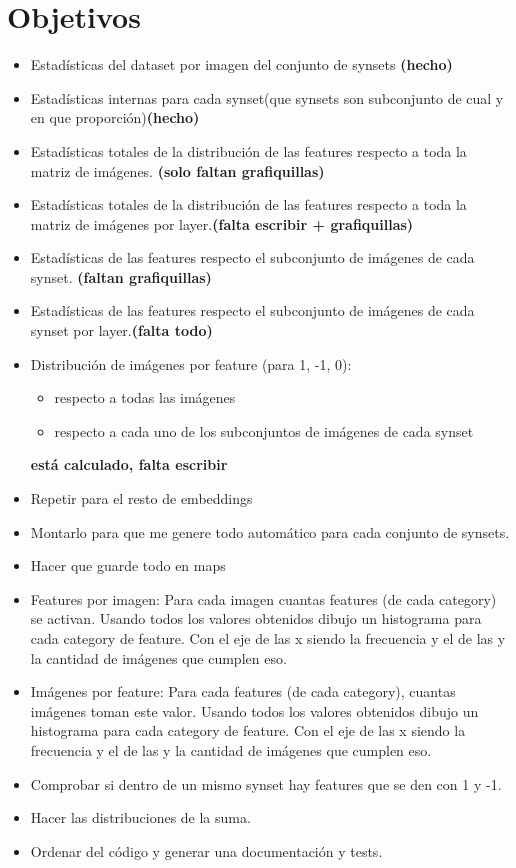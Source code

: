 \documentclass{article}
\begin{document}
\section{Objetivos}


\begin{itemize}
\item Estadísticas del dataset por imagen del conjunto de synsets \textbf{(hecho)}
\item Estadísticas internas para cada synset(que synsets son subconjunto de cual y en que proporción)\textbf{(hecho)}
\item Estadísticas totales de la distribución de las features respecto a toda la matriz de imágenes. \textbf{(solo faltan grafiquillas)}
\item  Estadísticas totales de la distribución de las features respecto a toda la matriz de imágenes por layer.\textbf{(falta escribir + grafiquillas)}
\item Estadísticas de las features respecto el subconjunto de imágenes de cada synset. \textbf{(faltan grafiquillas)}
\item Estadísticas de las features respecto el subconjunto de imágenes de cada synset por layer.\textbf{(falta todo)}
\item Distribución de imágenes por feature (para 1, -1, 0):
\begin{itemize}
\item respecto a todas las imágenes
\item respecto a cada uno de los subconjuntos de imágenes de cada synset 
\end{itemize}
\textbf{está calculado, falta escribir}
\item Repetir para el resto de embeddings
\item Montarlo para que me genere todo automático para cada conjunto de synsets.
\item Hacer que guarde todo en maps  
\item Features por imagen: Para cada imagen cuantas features (de cada category) se activan. Usando todos los valores obtenidos dibujo un histograma
para cada category de feature. Con el eje de las x siendo la frecuencia y el de las y la cantidad de imágenes que cumplen eso.
\item Imágenes por feature: Para cada features (de cada category), cuantas imágenes toman este valor. Usando todos los valores obtenidos dibujo un histograma
para cada category de feature. Con el eje de las x siendo la frecuencia y el de las y la cantidad de imágenes que cumplen eso.  
\item Comprobar si dentro de un mismo synset hay features que se den con 1 y -1.
\item Hacer las distribuciones de la suma.
\item Ordenar del código y generar una documentación y tests.

\end{itemize}
\end{document}
